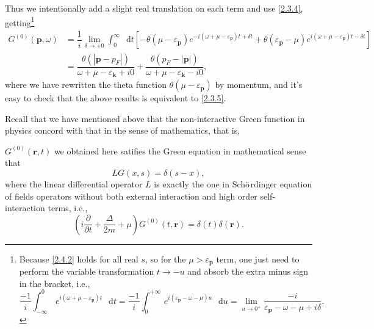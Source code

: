 \documentclass[b5paper,10pt,UTF8]{book}
\newcommand*\dd{\mathop{}\!\mathrm{d}}
\numberwithin{equation}{section}
\begin{document}
\begin{Proof}
				Thus we intentionally add a slight real translation on each term and use \eqref{2.3.4}, getting\footnote{Because \eqref{2.4.2} holds for all real $s$, so for the $\mu>\varepsilon_{\bm{p}}$ term, one just need to perform the variable transformation $t\rightarrow-u$ and absorb the extra minus sign in the bracket, i.e.,
				$$\dfrac{-1}{i}\int_{-\infty}^0\,e^{i(\omega+\mu-\varepsilon_{\bm p})t}\,\dd t=\dfrac{-1}{i}\int_0^{+\infty}\,e^{i(\varepsilon_{\bm{p}}-\omega-\mu)u}\,\dd u=\lim_{u\rightarrow0^+}\dfrac{-i}{\varepsilon_{\bm{p}}-\omega-\mu+i\delta}.$$}
				\begin{align}\label{2.3.6}
					G^{(0)}(\bm{p},\omega)&=\dfrac{1}{i}\lim_{\delta\rightarrow+0}\int_0^\infty\dd t\left[-\theta(\mu-\varepsilon_{\bm p})e^{-i(\omega+\mu-\varepsilon_{\bm{p}})t+\delta t}+\theta(\varepsilon_{\bm p}-\mu)e^{i(\omega+\mu-\varepsilon_{\bm{p}})t-\delta t}\right]\nonumber\\
					&=\dfrac{\theta(|\bm{p}-p_F|)}{\omega+\mu-\varepsilon_{\bm{k}}+i0}+\dfrac{\theta(p_F-|\bm{p}|)}{\omega+\mu-\varepsilon_{\bm{k}}-i0},
				\end{align}
				where we have rewritten the theta function $\theta(\mu-\varepsilon_{\bm p})$ by momentum, and it's easy to check that the above results is equivalent to \eqref{2.3.5}.
			\end{Proof}
			\hfill\par
			Recall that we have mentioned above that the non-interactive Green function in physics concord with that in the sense of mathematics, that is, 
			\begin{Corollary}
				$G^{(0)}(\bm{r},t)$ we obtained here satifies the Green equation in mathematical sense that
				$$LG(x,s)=\delta(s-x),$$
				where the linear differential operator $L$ is exactly the one in Sch$\ddot{\text o}$rdinger equation of fields operators without both external interaction and high order self-interaction terms, i.e.,
				\begin{equation}\label{2.3.7}
					\left(i\dfrac{\partial }{\partial t}+\dfrac{\Delta}{2m}+\mu\right)G^{(0)}(t,\bm{r})=\delta(t)\delta(\bm{r}).
				\end{equation}
			\end{Corollary}
\end{document}
